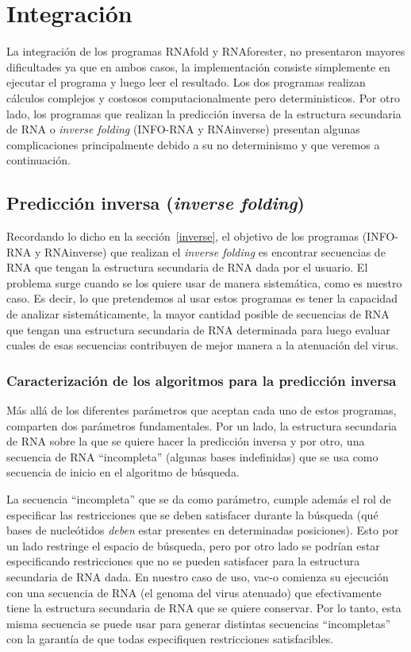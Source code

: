 \section{Integraci\'on}

La integraci\'on de los programas RNAfold y RNAforester, no presentaron mayores
dificultades ya que en ambos casos, la implementaci\'on consiste simplemente 
en ejecutar el programa y luego leer el resultado. Los dos programas
realizan c\'alculos complejos y costosos computacionalmente pero
deterministicos. Por otro lado, los programas que realizan la predicci\'on
inversa de la estructura secundaria de \ac{RNA} o \textit{inverse folding}
(INFO-RNA y RNAinverse) presentan algunas complicaciones principalmente debido a
su no determinismo y que veremos a continuaci\'on.

\subsection{Predicci\'on inversa (\textit{inverse folding})}

Recordando lo dicho en la secci\'on~\ref{inverse}, el objetivo de los programas
(INFO-RNA y RNAinverse) que realizan el \textit{inverse folding} es encontrar
secuencias de \ac{RNA} que tengan la estructura secundaria de \ac{RNA} dada por
el usuario. El problema surge cuando se los quiere usar de manera sistem\'atica,
como es nuestro caso. Es decir, lo que pretendemos al usar estos programas es
tener la capacidad de analizar sistem\'aticamente, la mayor cantidad posible de
secuencias de \ac{RNA} que tengan una estructura secundaria de \ac{RNA}
determinada para luego evaluar cuales de esas secuencias contribuyen de mejor
manera a la atenuaci\'on del virus.

\subsubsection{Caracterizaci\'on de los algoritmos para la predicci\'on inversa}

M\'as all\'a de los diferentes par\'ametros que aceptan cada uno de estos
programas, comparten dos par\'ametros fundamentales. Por un lado, la estructura
secundaria de \ac{RNA} sobre la que se quiere hacer la predicci\'on inversa y
por otro, una secuencia de \ac{RNA} ``incompleta'' (algunas bases indefinidas)
que se usa como secuencia de inicio en el algoritmo de b\'usqueda. 

La secuencia ``incompleta'' que se da como par\'ametro, cumple adem\'as el rol
de especificar las restricciones que se deben satisfacer durante la b\'usqueda
(qu\'e bases de nucle\'otidos \textit{deben} estar presentes en determinadas
posiciones). Esto por un lado restringe el espacio de b\'usqueda, pero por otro
lado se podr\'ian estar especificando restricciones que no se pueden satisfacer
para la estructura secundaria de \ac{RNA} dada. En nuestro caso de uso,
\ac{vac-o} comienza su ejecuci\'on con una secuencia de \ac{RNA} (el genoma del
virus atenuado) que efectivamente tiene la estructura secundaria de \ac{RNA} que
se quiere conservar. Por lo tanto, esta misma secuencia se puede usar para
generar distintas secuencias ``incompletas'' con la garant\'ia de que todas
especifiquen restricciones satisfacibles.

